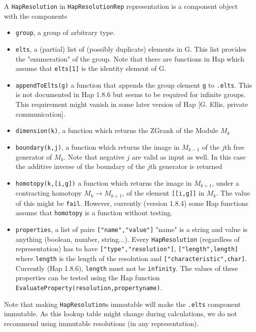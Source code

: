 \documentclass[a4paper,11pt]{report}
\begin{document}
{{ A \texttt{HapResolution} in \texttt{HapResolutionRep} representation is a component object with the components 
\begin{itemize}
\item \texttt{group}, a group of arbitrary type.
\item \texttt{elts}, a (partial) list of (possibly duplicate) elements in G. This list provides
the "enumeration" of the group. Note that there are functions in Hap which
assume that \texttt{elts[1]} is the identity element of G. 
\item \texttt{appendToElts(g)} a function that appends the group element \texttt{g} to \texttt{.elts}. This is not documented in Hap 1.8.6 but seems to be required for infinite
groups. This requirement might vanish in some later version of Hap [G. Ellis,
private communication]. 
\item \texttt{dimension(k)}, a function which returns the ZG\texttt{}rank of the Module $M_k$
\item \texttt{boundary(k,j)}, a function which returns the image in $M_{k-1}$ of the $j$th free generator of $M_k$. Note that negative $j$ are valid as input as well. In this case the additive inverse of the boundary
of the $j$th generator is returned
\item \texttt{homotopy(k,[i,g])} a function which returns the image in $M_{k+1}$, under a contracting homotopy $M_k \to M_{k+1}$, of the element \texttt{[[i,g]]} in $M_k$. The value of this might be \texttt{fail}. However, currently (version 1.8.4) some Hap functions assume that \texttt{homotopy} is a function without testing.
\item \texttt{properties}, a list of pairs \texttt{["name","value"]} "name" is a string and value is anything (boolean, number, string...). Every \texttt{HapResolution} (regardless of representation) has to have \texttt{["type","resolution"]}, \texttt{["length",length]} where \texttt{length} is the length of the resolution and \texttt{["characteristic",char]}. Currently (Hap 1.8.6), \texttt{length} must not be \texttt{infinity}. The values of these properties can be tested using the Hap function \texttt{EvaluateProperty(resolution,propertyname)}.
\end{itemize}
 Note that making \texttt{HapResolution}s immutable will make the \texttt{.elts} component immutable. As this lookup table might change during calculations, we
do not recommend using immutable resolutions (in any representation). }

 
}
\end{document}
